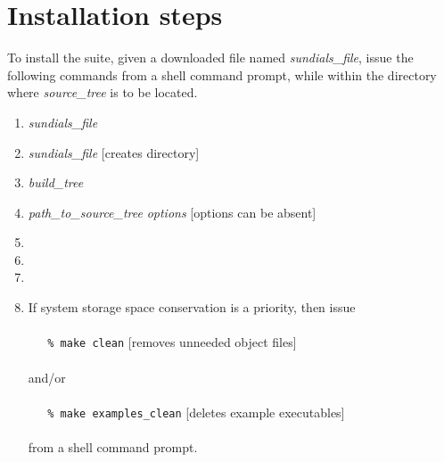 \section{Installation steps}\label{ss:install_steps}

To install the {\sundials} suite, given a downloaded file named
{\em sundials\_file}, issue the following commands from
a shell command prompt, while within the directory where {\em source\_tree}
is to be located.
\begin{enumerate}
\item {} {\em sundials\_file}
\item {} {\em sundials\_file}\hspace{3em} [creates  directory]
\item {} {\em build\_tree}
\item {\em path\_to\_source\_tree} {\em options}\hspace{2em} [options can be absent]
\item {}
\item {}
\item {}
\item If system storage space conservation is a priority, then issue \\ \\
\verb+   % make clean+ \hspace{2em} [removes unneeded object files] \\ \\
and/or \\ \\
\verb+   % make examples_clean+ \hspace{2em} [deletes example executables] \\ \\
from a shell command prompt.
\end{enumerate}

